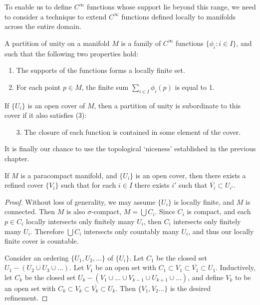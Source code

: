 To enable us to define $C^\infty$ functions whose support lie beyond this range, we need to consider a technique to extend $C^\infty$ functions defined locally to manifolds across the entire domain.

\begin{definition}
    A partition of unity on a manifold $M$ is a family of $C^\infty$ functions $\{ \phi_i : i \in I \}$, and such that the following two properties hold:
    \begin{enumerate}
        \item The supports of the functions forms a locally finite set.
        \item For each point $p \in M$, the finite sum $\sum_{i \in I} \phi_i(p)$ is equal to 1.
    \end{enumerate}
    If $\{ U_i \}$ is an open cover of $M$, then a partition of unity is subordinate to this cover if it also satisfies (3):
    \begin{enumerate}
        \item[3.] The closure of each function is contained in some element of the cover.
    \end{enumerate}
\end{definition}

It is finally our chance to use the topological `niceness' established in the previous chapter.

\begin{lemma}
    If $M$ is a paracompact manifold, and $\{ U_i \}$ is an open cover, then there exists a refined cover $\{ V_i \}$ such that for each $i \in I$ there exists $i'$ such that $\overline{V_i} \subset U_{i'}$.
\end{lemma}
\begin{proof}
    Without loss of generality, we may assume $\{ U_i \}$ is locally finite, and $M$ is connected. Then $M$ is also $\sigma$-compact, $M = \bigcup C_i$. Since $C_i$ is compact, and each $p \in C_i$ locally intersects only finitely many $U_i$, then $C_i$ intersects only finitely many $U_i$. Therefore $\bigcup C_i$ intersects only countably many $U_i$, and thus our locally finite cover is countable.

    Consider an ordering $\{ U_1, U_2, \dots \}$ of $\{ U_i \}$. Let $C_1$ be the closed set $U_1 - (U_2 \cup U_3 \cup \dots)$. Let $V_1$ be an open set with $C_1 \subset V_1 \subset \overline{V_1} \subset U_1$. Inductively, let $C_k$ be the closed set $U_k - (V_1 \cup \dots \cup V_{k-1} \cup U_{k+1} \cup \dots)$, and define $V_k$ to be an open set with $C_k \subset V_k \subset \overline{V_k} \subset U_k$. Then $\{ V_1, V_2 \dots \}$ is the desired refinement.
\end{proof}

